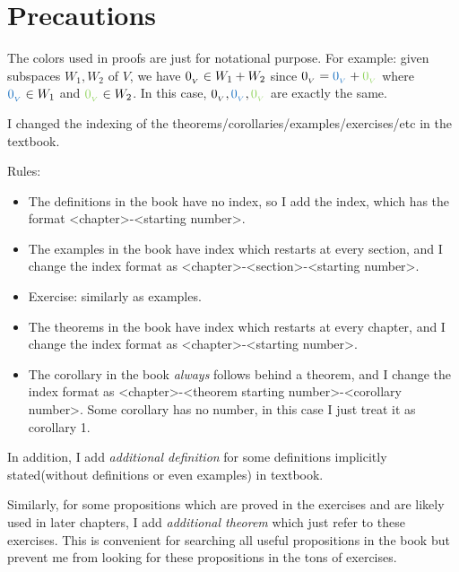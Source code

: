 \setcounter{chapter}{-1}
\chapter{Precautions}

\begin{note}
The colors used in proofs are just for notational purpose.
For example: given subspaces \(W_1, W_2\) of \(V\), we have \(0_{_V} \in W_1 + W_2\) since \(\OV = \BLUE{\OV} + \GREEN{\OV}\) where \(\BLUE{\OV} \in W_1\) and \(\GREEN{\OV} \in W_2\).
In this case, \(\OV, \BLUE{\OV}, \GREEN{\OV}\) are exactly the same.
\end{note}

\begin{note}
I changed the indexing of the theorems/corollaries/examples/exercises/etc in the textbook.

Rules:
\begin{itemize}
\item The definitions in the book have no index, so I add the index, which has the format <chapter>-<starting number>.
\item The examples in the book have index which restarts at every section, and I change the index format as <chapter>-<section>-<starting number>.
\item Exercise: similarly as examples.
\item The theorems in the book have index which restarts at every chapter, and I change the index format as <chapter>-<starting number>.
\item The corollary in the book \emph{always} follows behind a theorem, and I change the index format as <chapter>-<theorem starting number>-<corollary number>.
    Some corollary has no number, in this case I just treat it as corollary 1.
\end{itemize}

In addition, I add \emph{additional definition} for some definitions implicitly stated(without definitions or even examples) in textbook.

Similarly, for some propositions which are proved in the exercises and are likely used in later chapters, I add \emph{additional theorem} which just refer to these exercises.
This is convenient for searching all useful propositions in the book but prevent me from looking for these propositions in the tons of exercises.
\end{note}